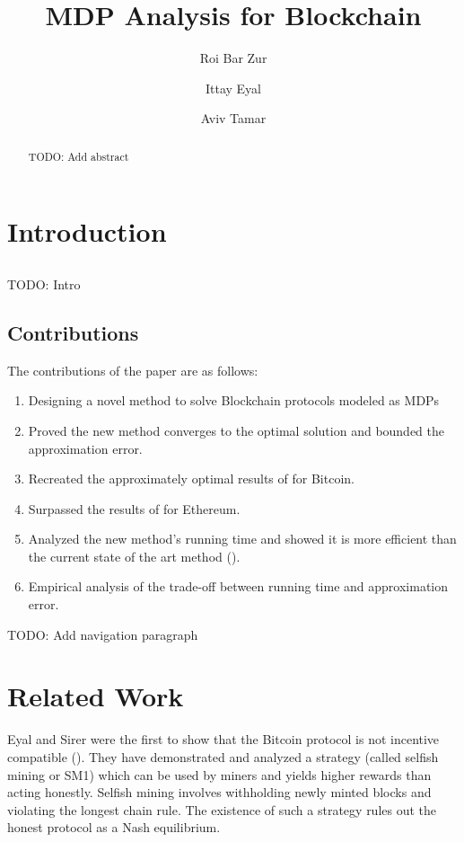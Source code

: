 \documentclass{article}
\title{MDP Analysis for Blockchain}
\author{Roi Bar Zur \and Ittay Eyal \and Aviv Tamar}
\date{}
\begin{document}
\maketitle

\begin{abstract}
    TODO: Add abstract
\end{abstract}

\section{Introduction}

\subsection{}
TODO: Intro

\subsection{Contributions}
The contributions of the paper are as follows:
\begin{enumerate}
    \item Designing a novel method to solve Blockchain protocols modeled as MDPs
    \item Proved the new method converges to the optimal solution and bounded the approximation error.
    \item Recreated the approximately optimal results of \cite{sapirshtein2016optimal} for Bitcoin.
    \item Surpassed the results of \cite{hou2019squirrl} for Ethereum.
    \item Analyzed the new method's running time and showed it is more efficient than the current state of the art method (\cite{sapirshtein2016optimal}).
    \item Empirical analysis of the trade-off between running time and approximation error.
\end{enumerate}

TODO: Add navigation paragraph

\section{Related Work}
Eyal and Sirer were the first to show that the Bitcoin protocol is not incentive compatible (\cite{eyalmajority}). They have demonstrated and analyzed a strategy (called selfish mining or SM1) which can be used by miners and yields higher rewards than acting honestly. Selfish mining involves withholding newly minted blocks and violating the longest chain rule. The existence of such a strategy rules out the honest protocol as a Nash equilibrium.
\end{document}
